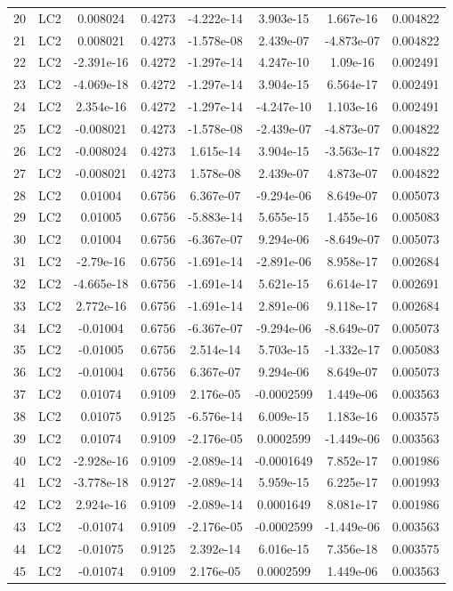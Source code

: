 \documentclass{article}%
\begin{document}
\begin{longtable}{| c c | c c c c c c |}
20&LC2&0.008024&0.4273&{-}4.222e{-}14&3.903e{-}15&1.667e{-}16&0.004822\\%
21&LC2&0.008021&0.4273&{-}1.578e{-}08&2.439e{-}07&{-}4.873e{-}07&0.004822\\%
22&LC2&{-}2.391e{-}16&0.4272&{-}1.297e{-}14&4.247e{-}10&1.09e{-}16&0.002491\\%
23&LC2&{-}4.069e{-}18&0.4272&{-}1.297e{-}14&3.904e{-}15&6.564e{-}17&0.002491\\%
24&LC2&2.354e{-}16&0.4272&{-}1.297e{-}14&{-}4.247e{-}10&1.103e{-}16&0.002491\\%
25&LC2&{-}0.008021&0.4273&{-}1.578e{-}08&{-}2.439e{-}07&{-}4.873e{-}07&0.004822\\%
26&LC2&{-}0.008024&0.4273&1.615e{-}14&3.904e{-}15&{-}3.563e{-}17&0.004822\\%
27&LC2&{-}0.008021&0.4273&1.578e{-}08&2.439e{-}07&4.873e{-}07&0.004822\\%
28&LC2&0.01004&0.6756&6.367e{-}07&{-}9.294e{-}06&8.649e{-}07&0.005073\\%
29&LC2&0.01005&0.6756&{-}5.883e{-}14&5.655e{-}15&1.455e{-}16&0.005083\\%
30&LC2&0.01004&0.6756&{-}6.367e{-}07&9.294e{-}06&{-}8.649e{-}07&0.005073\\%
31&LC2&{-}2.79e{-}16&0.6756&{-}1.691e{-}14&{-}2.891e{-}06&8.958e{-}17&0.002684\\%
32&LC2&{-}4.665e{-}18&0.6756&{-}1.691e{-}14&5.621e{-}15&6.614e{-}17&0.002691\\%
33&LC2&2.772e{-}16&0.6756&{-}1.691e{-}14&2.891e{-}06&9.118e{-}17&0.002684\\%
34&LC2&{-}0.01004&0.6756&{-}6.367e{-}07&{-}9.294e{-}06&{-}8.649e{-}07&0.005073\\%
35&LC2&{-}0.01005&0.6756&2.514e{-}14&5.703e{-}15&{-}1.332e{-}17&0.005083\\%
36&LC2&{-}0.01004&0.6756&6.367e{-}07&9.294e{-}06&8.649e{-}07&0.005073\\%
37&LC2&0.01074&0.9109&2.176e{-}05&{-}0.0002599&1.449e{-}06&0.003563\\%
38&LC2&0.01075&0.9125&{-}6.576e{-}14&6.009e{-}15&1.183e{-}16&0.003575\\%
39&LC2&0.01074&0.9109&{-}2.176e{-}05&0.0002599&{-}1.449e{-}06&0.003563\\%
40&LC2&{-}2.928e{-}16&0.9109&{-}2.089e{-}14&{-}0.0001649&7.852e{-}17&0.001986\\%
41&LC2&{-}3.778e{-}18&0.9127&{-}2.089e{-}14&5.959e{-}15&6.225e{-}17&0.001993\\%
42&LC2&2.924e{-}16&0.9109&{-}2.089e{-}14&0.0001649&8.081e{-}17&0.001986\\%
43&LC2&{-}0.01074&0.9109&{-}2.176e{-}05&{-}0.0002599&{-}1.449e{-}06&0.003563\\%
44&LC2&{-}0.01075&0.9125&2.392e{-}14&6.016e{-}15&7.356e{-}18&0.003575\\%
45&LC2&{-}0.01074&0.9109&2.176e{-}05&0.0002599&1.449e{-}06&0.003563\\%
\end{longtable}%
\end{document}
